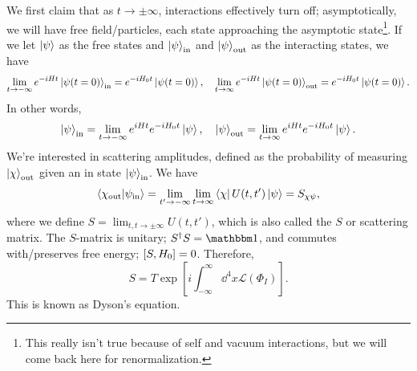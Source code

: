 \documentclass{article}
\begin{document}
We first claim that as $t\to\pm\infty$, interactions effectively turn off; asymptotically, we will have free field/particles, each state approaching the asymptotic state\footnote{This really isn't true because of self and vacuum interactions, but we will come back here for renormalization.}. If we let $\ket\psi$ as the free states and $\ket\psi_\text{in}$ and $\ket\psi_\text{out}$ as the interacting states, we have 
$$\lim_{t\to-\infty}e^{-iHt}\ket{\psi(t=0)}_\text{in}=e^{-iH_0t}\ket{\psi(t=0)},\quad \lim_{t\to\infty}e^{-iHt}\ket{\psi(t=0)}_\text{out}=e^{-iH_0t}\ket{\psi(t=0)}.$$
In other words, 
$$\ket\psi_\text{in}=\lim_{t\to-\infty}e^{iHt}e^{-iH_0t}\ket\psi,\quad\ket\psi_\text{out}=\lim_{t\to\infty}e^{iHt}e^{-iH_0t}\ket\psi.$$
We're interested in scattering amplitudes, defined as the probability of measuring $\ket\chi_\text{out}$ given an in state $\ket\psi_\text{in}$. We have 
$$\braket{\chi_\text{out}}{\psi_\text{in}}=\lim_{t'\to-\infty}\lim_{t\to\infty}\bra\chi U(t,t')\ket\psi=S_{\chi\psi},$$
where we define $S=\lim_{t,t\to\pm\infty}U(t,t')$, which is also called the $S$ or scattering matrix. The $S$-matrix is unitary; $S^\dag S=\mathbbm 1$, and commutes with/preserves free energy; $\comm{S}{H_0}=0$. Therefore, 
\begin{equation}
    S=T\exp\left[i\int^\infty_{-\infty}\dd^4x\mathcal L(\Phi_I)\right].
\end{equation}
This is known as Dyson's equation. 
\end{document}

